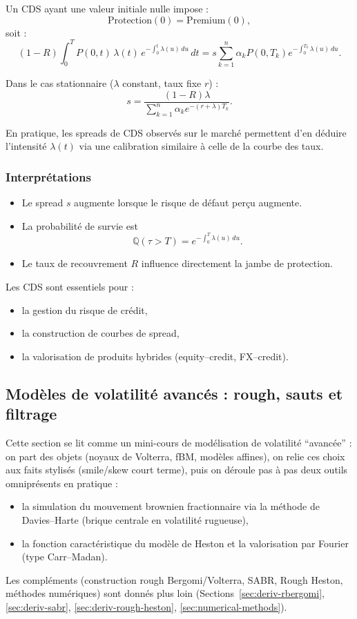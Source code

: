 \documentclass[11pt,a4paper]{article}
\newcommand{\1}{\mathbf{1}}
\begin{document}
Un CDS ayant une valeur initiale nulle impose :
\[
\mathrm{Protection}(0) = \mathrm{Premium}(0),
\]
soit :
\[
(1 - R)\int_0^T P(0,t)\, \lambda(t)\, e^{-\int_0^t \lambda(u)\,du}\, dt
=
s
\sum_{k=1}^{n}
\alpha_k P(0,T_k) e^{-\int_0^{T_k} \lambda(u)\,du}.
\]

Dans le cas stationnaire ($\lambda$ constant, taux fixe $r$) :
\[
s
=
\frac{ (1-R) \lambda }{ \sum_{k=1}^{n} \alpha_k e^{-(r+\lambda)T_k} }.
\]

En pratique, les spreads de CDS observés sur le marché permettent d'en déduire
l'intensit\'e $\lambda(t)$ via une calibration similaire à celle de la courbe
des taux.

\subsubsection{Interprétations}

\begin{itemize}
  \item Le spread $s$ augmente lorsque le risque de d\'efaut per\c{c}u augmente.
  \item La probabilit\'e de survie est
  \[
    \mathbb{Q}(\tau > T) = e^{-\int_0^T \lambda(u)\,du}.
  \]
  \item Le taux de recouvrement $R$ influence directement la jambe de protection.
\end{itemize}

Les CDS sont essentiels pour :
\begin{itemize}
  \item la gestion du risque de cr\'edit,
  \item la construction de courbes de spread,
  \item la valorisation de produits hybrides (equity--credit, FX--credit).
\end{itemize}


\subsection{Mod\`eles de volatilit\'e avanc\'es : rough, sauts et filtrage}

Cette section se lit comme un mini-cours de mod\'elisation de volatilité ``avanc\'ee'' :
on part des objets (noyaux de Volterra, fBM, mod\`eles affines), on relie ces choix
aux faits stylis\'es (smile/skew court terme), puis on d\'eroule pas \`a pas deux
outils omnipr\'esents en pratique :
\begin{itemize}
  \item la simulation du mouvement brownien fractionnaire via la m\'ethode de Davies--Harte (brique centrale en volatilité rugueuse),
  \item la fonction caract\'eristique du mod\`ele de Heston et la valorisation par Fourier (type Carr--Madan).
\end{itemize}
Les compl\'ements (construction rough Bergomi/Volterra, SABR, Rough Heston, m\'ethodes num\'eriques)
sont donn\'es plus loin (Sections~\ref{sec:deriv-rbergomi}, \ref{sec:deriv-sabr}, \ref{sec:deriv-rough-heston}, \ref{sec:numerical-methods}).
\end{document}
